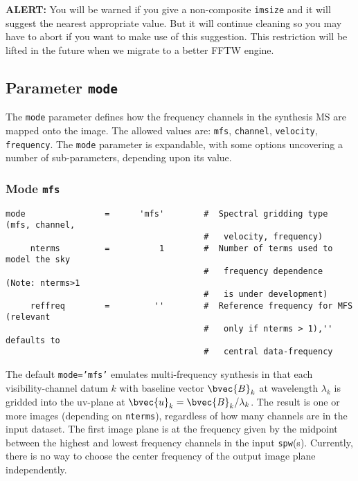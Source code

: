 {\bf ALERT:} You will be warned if you give a non-composite
{\tt imsize} and it will suggest the nearest appropriate value.
But it will continue cleaning so you may have to abort if you want
to make use of this suggestion.  This restriction will be lifted
in the future when we migrate to a better FFTW engine.

\subsection{Parameter {\tt mode} }
\label{section:im.pars.mode}

The {\tt mode} parameter defines how the frequency channels in the
synthesis MS are mapped onto the image.  The allowed values are:
{\tt mfs}, {\tt channel}, {\tt velocity}, {\tt frequency}.
The {\tt mode} parameter
is expandable, with some options uncovering a number of
sub-parameters, depending upon its value.

\subsubsection{Mode {\tt mfs} }
\label{section:im.pars.mode.mfs}
\small
\begin{verbatim}
mode                =      'mfs'        #  Spectral gridding type (mfs, channel,
                                        #   velocity, frequency)
     nterms         =          1        #  Number of terms used to model the sky
                                        #   frequency dependence (Note: nterms>1
                                        #   is under development)
     reffreq        =         ''        #  Reference frequency for MFS (relevant
                                        #   only if nterms > 1),'' defaults to
                                        #   central data-frequency
\end{verbatim}
\normalsize

The default {\tt mode='mfs'} emulates multi-frequency synthesis in
that each visibility-channel datum $k$ with baseline vector
$\bvec{B}_k$ at wavelength $\lambda_k$ is gridded into the uv-plane at
$\bvec{u}_k = \bvec{B}_k/\lambda_k$.  The result is one or more images
(depending on {\tt nterms}), regardless of how many channels are in the input dataset.
The first image plane is at the frequency given by the midpoint between
the highest and lowest frequency channels in the input {\tt spw}(s).
Currently, there is no way to choose the center frequency of the 
output image plane independently.

